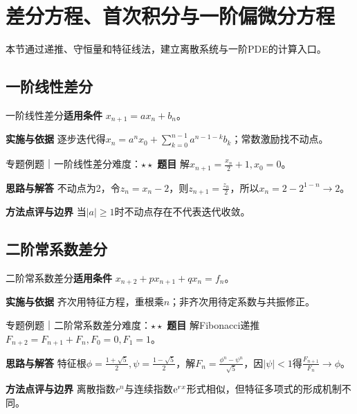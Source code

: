 \section{差分方程、首次积分与一阶偏微分方程}\label{mat:difference_pde}
\begin{examtip}本节通过递推、守恒量和特征线法，建立离散系统与一阶PDE的计算入口。\end{examtip}
\subsection{一阶线性差分}\label{mat:difference_pde:difference1}
\begin{method}{一阶线性差分}\textbf{适用条件} $x_{n+1}=ax_n+b_n$。\par\textbf{实施与依据} 逐步迭代得$x_n=a^nx_0+\sum_{k=0}^{n-1}a^{n-1-k}b_k$；常数激励找不动点。\end{method}
\begin{example}{专题例题｜一阶线性差分}{难度：$\star\star$}
\textbf{题目} 解$x_{n+1}=\frac{x_n}{2}+1,x_0=0$。\par\textbf{思路与解答} 不动点为2，令$z_n=x_n-2$，则$z_{n+1}=\frac{z_n}{2}$，所以$x_n=2-2^{1-n}\to2$。\par\textbf{方法点评与边界} 当$|a|\ge1$时不动点存在不代表迭代收敛。
\end{example}
\subsection{二阶常系数差分}\label{mat:difference_pde:difference2}
\begin{method}{二阶常系数差分}\textbf{适用条件} $x_{n+2}+px_{n+1}+qx_n=f_n$。\par\textbf{实施与依据} 齐次用特征方程，重根乘$n$；非齐次用待定系数与共振修正。\end{method}
\begin{example}{专题例题｜二阶常系数差分}{难度：$\star\star$}
\textbf{题目} 解Fibonacci递推$F_{n+2}=F_{n+1}+F_n,F_0=0,F_1=1$。\par\textbf{思路与解答} 特征根$\phi=\frac{1+\sqrt5}{2},\psi=\frac{1-\sqrt5}{2}$，解$F_n=\frac{\phi^n-\psi^n}{\sqrt5}$，因$|\psi|<1$得$\frac{F_{n+1}}{F_n}\to\phi$。\par\textbf{方法点评与边界} 离散指数$r^n$与连续指数$\mathrm{e}^{rx}$形式相似，但特征多项式的形成机制不同。
\end{example}
